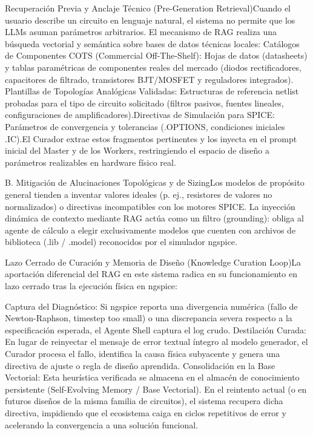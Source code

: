 Recuperación Previa y Anclaje Técnico (Pre-Generation Retrieval)Cuando el usuario describe un circuito en lenguaje natural, el sistema no permite que los LLMs asuman parámetros arbitrarios. El mecanismo de RAG realiza una búsqueda vectorial y semántica sobre bases de datos técnicas locales:   Catálogos de Componentes COTS (Commercial Off-The-Shelf): Hojas de datos (datasheets) y tablas paramétricas de componentes reales del mercado (diodos rectificadores, capacitores de filtrado, transistores BJT/MOSFET y reguladores integrados).   Plantillas de Topologías Analógicas Validadas: Estructuras de referencia netlist probadas para el tipo de circuito solicitado (filtros pasivos, fuentes lineales, configuraciones de amplificadores).Directivas de Simulación para SPICE: Parámetros de convergencia y tolerancias (.OPTIONS, condiciones iniciales .IC).El Curador extrae estos fragmentos pertinentes y los inyecta en el prompt inicial del Master y de los Workers, restringiendo el espacio de diseño a parámetros realizables en hardware físico real.   

B. Mitigación de Alucinaciones Topológicas y de SizingLos modelos de propósito general tienden a inventar valores ideales (p. ej., resistores de valores no normalizados) o directivas incompatibles con los motores SPICE. La inyección dinámica de contexto mediante RAG actúa como un filtro (grounding): obliga al agente de cálculo a elegir exclusivamente modelos que cuenten con archivos de biblioteca (.lib / .model) reconocidos por el simulador ngspice.

Lazo Cerrado de Curación y Memoria de Diseño (Knowledge Curation Loop)La aportación diferencial del RAG en este sistema radica en su funcionamiento en lazo cerrado tras la ejecución física en ngspice:

Captura del Diagnóstico: Si ngspice reporta una divergencia numérica (fallo de Newton-Raphson, timestep too small) o una discrepancia severa respecto a la especificación esperada, el Agente Shell captura el log crudo.
Destilación Curada: En lugar de reinyectar el mensaje de error textual íntegro al modelo generador, el Curador procesa el fallo, identifica la causa física subyacente y genera una directiva de ajuste o regla de diseño aprendida.
Consolidación en la Base Vectorial: Esta heurística verificada se almacena en el almacén de conocimiento persistente (Self-Evolving Memory / Base Vectorial). En el reintento actual (o en futuros diseños de la misma familia de circuitos), el sistema recupera dicha directiva, impidiendo que el ecosistema caiga en ciclos repetitivos de error y acelerando la convergencia a una solución funcional. 


